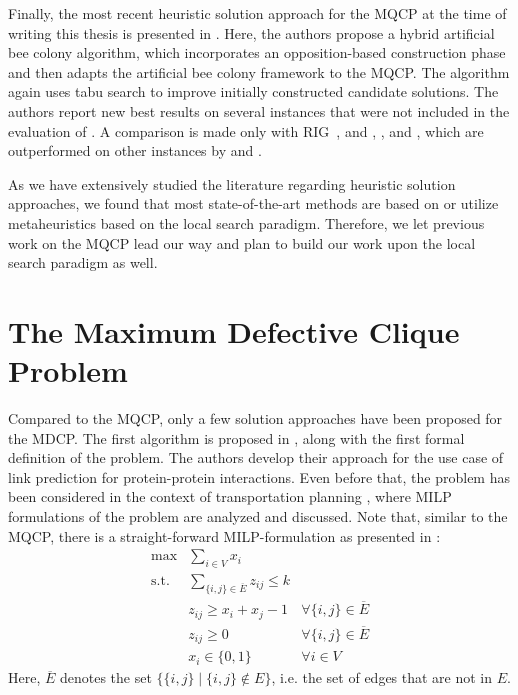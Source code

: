 \documentclass[draft,final]{vutinfth} %
\begin{document}
Finally, the most recent heuristic solution approach for the MQCP at the time of writing this thesis is presented in \cite{peng_solving_2021}. Here, the authors propose a hybrid artificial bee colony algorithm, which incorporates an opposition-based construction phase and then adapts the artificial bee colony framework to the MQCP. The algorithm again uses tabu search to improve initially constructed candidate solutions. 
The authors report new best results on several instances that were not included in the evaluation of \cite{chen_nuqclq_2021}. A comparison is made only with RIG~\cite{oliveira2013construction}, and \cite{pinto2015biased}, \cite{pinto_biased_2018}, and \cite{pinto2021brkga}, which are outperformed on other instances by \cite{chen_nuqclq_2021} and \cite{zhou_opposition-based_2020}. 

As we have extensively studied the literature regarding heuristic solution approaches, we found that most state-of-the-art methods are based on or utilize metaheuristics based on the local search paradigm. Therefore, we let previous work on the MQCP lead our way and plan to build our work upon the local search paradigm as well. 

\section{The Maximum Defective Clique Problem}\label{sec:mdcp-related-work}

Compared to the MQCP, only a few solution approaches have been proposed for the MDCP. 
The first algorithm is proposed in \cite{Yu2006}, along with the first formal definition of the problem. The authors develop their approach for the use case of link prediction for protein-protein interactions. Even before that, the problem has been considered in the context of transportation planning \cite{Sherali2002}, where MILP formulations of the problem are analyzed and discussed. 
Note that, similar to the MQCP, there is a straight-forward MILP-formulation as presented in \cite{Sherali2006}: 
\begin{align}
    \max & \sum_{i \in V} x_i &\\
    \text{s.t.} & \sum_{\{i,j\} \in \overline{E}} z_{ij} \leq k &\\
    & z_{ij} \geq x_i + x_j - 1 & \forall \{i,j\} \in \overline{E} \\
    & z_{ij} \geq 0 & \forall \{i,j\} \in \overline{E} \\
    & x_i \in \{0,1\} & \forall i \in V  
\end{align}
Here, $\overline{E}$ denotes the set $\{\{i,j\} \mid \{i,j\} \notin E\}$, i.e. the set of edges that are not in $E$. 
\end{document}
